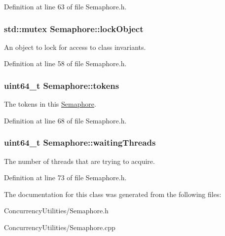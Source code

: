 Definition at line 63 of file Semaphore.\+h.

\hypertarget{class_semaphore_a1a62705f4517e4142f19e255b48a389f}{
\subsubsection[{lock\+Object}]{\setlength{\rightskip}{0pt plus 5cm}std\+::mutex Semaphore\+::lock\+Object\hspace{0.3cm}{\ttfamily [protected]}}}\label{class_semaphore_a1a62705f4517e4142f19e255b48a389f}
An object to lock for access to class invariants. 

Definition at line 58 of file Semaphore.\+h.

\hypertarget{class_semaphore_a881a7148dec63cea7a8205b707101f81}{
\subsubsection[{tokens}]{\setlength{\rightskip}{0pt plus 5cm}uint64\+\_\+t Semaphore\+::tokens\hspace{0.3cm}{\ttfamily [protected]}}}\label{class_semaphore_a881a7148dec63cea7a8205b707101f81}
The tokens in this \hyperlink{class_semaphore}{Semaphore}. 

Definition at line 68 of file Semaphore.\+h.

\hypertarget{class_semaphore_a3d0314bc7ca67d2de9d5a4b5acf8fb18}{
\subsubsection[{waiting\+Threads}]{\setlength{\rightskip}{0pt plus 5cm}uint64\+\_\+t Semaphore\+::waiting\+Threads\hspace{0.3cm}{\ttfamily [protected]}}}\label{class_semaphore_a3d0314bc7ca67d2de9d5a4b5acf8fb18}
The number of threads that are trying to acquire. 

Definition at line 73 of file Semaphore.\+h.



The documentation for this class was generated from the following files\+:\begin{DoxyCompactItemize}
\item 
Concurrency\+Utilities/Semaphore.\+h\item 
Concurrency\+Utilities/Semaphore.\+cpp\end{DoxyCompactItemize}
